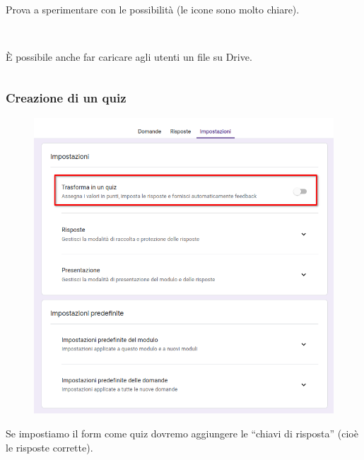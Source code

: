\documentclass[]{beamer}
\begin{document}
\begin{frame}
\begin{columns}
\begin{column}{.65\textwidth}
    ~

    Prova a sperimentare con le possibilità (le icone sono molto chiare).\pause

    ~

    È possibile anche far caricare agli utenti un file su Drive.
  \end{column}
\end{columns}
\end{frame}


\begin{frame}
\frametitle{Creazione di un quiz}
\begin{figure}
  \includegraphics[width=.5\columnwidth]{img/form7.png}
\end{figure}
Se impostiamo il form come quiz dovremo aggiungere le ``chiavi di risposta'' (cioè le risposte corrette).
\end{frame}
\end{document}
